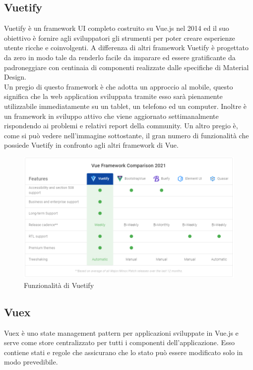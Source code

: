 \subsection{Vuetify}
Vuetify è un framework UI completo costruito su Vue.js nel 2014 ed il suo obiettivo è fornire agli sviluppatori gli strumenti per poter creare esperienze utente ricche e coinvolgenti. A differenza di altri framework Vuetify è progettato da zero in modo tale da renderlo facile da imparare ed essere gratificante da padroneggiare con centinaia di componenti realizzate dalle specifiche di Material Design.\\
Un pregio di questo framework è che adotta un approccio al mobile, questo significa che la web application sviluppata tramite esso sarà pienamente utilizzabile immediatamente su un tablet, un telefono ed un computer. Inoltre è un framework in sviluppo attivo che viene aggiornato settimanalmente rispondendo ai problemi e relativi report della community. Un altro pregio è, come si può vedere nell'immagine sottostante, il gran numero di funzionalità che possiede Vuetify in confronto agli altri framework di Vue.
\begin{figure}[H]
	\begin{center}
		\includegraphics[width=1\columnwidth]{immagini/vuetify.png}
		\caption{Funzionalità di Vuetify}
	\end{center}
\end{figure}
\subsection{Vuex}
Vuex è uno state management pattern per applicazioni sviluppate in Vue.js e serve come store centralizzato per tutti i componenti dell'applicazione. Esso contiene stati e regole che assicurano che lo stato può essere modificato solo in modo prevedibile.

